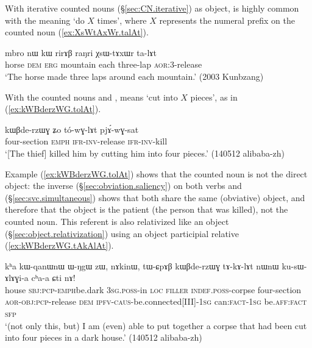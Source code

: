 With iterative counted nouns (§\ref{sec:CN.iterative}) as object,  is highly common with the meaning `do $X$ times', where $X$ represents the numeral prefix on the counted noun  (\ref{ex:XsWtAxWr.talAt}).

\begin{exe}
\ex \label{ex:XsWtAxWr.talAt}
\gll mbro nɯ kɯ rirɤβ raŋri χsɯ-tɤxɯr ta-lɤt \\ 
horse \textsc{dem} \textsc{erg} mountain each three-lap \textsc{aor}:3\flobv{}-release \\
\glt `The horse made three laps around each mountain.' (2003 Kunbzang)
\end{exe}

With the counted nouns  and ,  means `cut into $X$ pieces', as in (\ref{ex:kWBderzWG.tolAt}).

\begin{exe}
\ex \label{ex:kWBderzWG.tolAt}
\gll  kɯβde-rzɯɣ ʑo tó-wɣ-lɤt pjɤ́-wɣ-sat \\
four-section \textsc{emph} \textsc{ifr}-\textsc{inv}-release \textsc{ifr}-\textsc{inv}-kill \\
\glt `[The thief] killed him by cutting him into four pieces.' (140512 alibaba-zh)
\end{exe}

Example (\ref{ex:kWBderzWG.tolAt}) shows that the counted noun is not the direct object: the inverse (§\ref{sec:obviation.saliency}) on both verbs  and  (§\ref{sec:svc.simultaneous}) shows that both share the same (obviative) object, and therefore that the object is the patient (the person that was killed), not the counted noun. This referent is also relativized like an object (§\ref{sec:object.relativization}) using an object participial relative (\ref{ex:kWBderzWG.tAkAlAt}).

\begin{exe}
\ex \label{ex:kWBderzWG.tAkAlAt}
\gll kʰa kɯ-qanɯ\redp{}nɯ ɯ-ŋgɯ zɯ, nɤkinɯ, tɯ-ɕpɤβ kɯβde-rzɯɣ tɤ-kɤ-lɤt nɯnɯ ku-sɯ-ɤlɤɣi-a cʰa-a ɕti nɤ! \\
house \textsc{sbj}:\textsc{pcp}-\textsc{emph}\redp{}be.dark \textsc{3sg}.\textsc{poss}-in \textsc{loc} \textsc{filler} \textsc{indef}.\textsc{poss}-corpse four-section \textsc{aor}-\textsc{obj}:\textsc{pcp}-release \textsc{dem} \textsc{ipfv}-\textsc{caus}-be.connected[III]-\textsc{1sg} can:\textsc{fact}-\textsc{1sg} be.\textsc{aff}:\textsc{fact} \textsc{sfp} \\
\glt `(not only this, but) I am (even) able to put together a corpse that had been cut into four pieces in a dark house.' (140512 alibaba-zh)
\end{exe}

